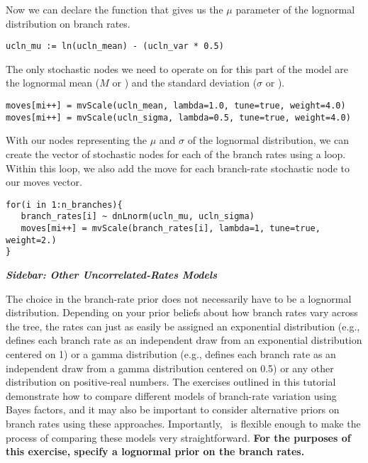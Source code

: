 Now we can declare the function that gives us the $\mu$ parameter of the lognormal distribution on branch rates.
{\tt \begin{snugshade*}
\begin{lstlisting}
ucln_mu := ln(ucln_mean) - (ucln_var * 0.5)
\end{lstlisting}
\end{snugshade*}}

The only stochastic nodes we need to operate on for this part of the model are the lognormal mean ($M$ or ) and the standard deviation ($\sigma$ or ).
{\tt \begin{snugshade*}
\begin{lstlisting}
moves[mi++] = mvScale(ucln_mean, lambda=1.0, tune=true, weight=4.0)
moves[mi++] = mvScale(ucln_sigma, lambda=0.5, tune=true, weight=4.0)
\end{lstlisting}
\end{snugshade*}}

With our nodes representing the $\mu$ and $\sigma$ of the lognormal distribution, we can create the vector of stochastic nodes for each of the branch rates using a  loop. 
Within this loop, we also add the move for each branch-rate stochastic node to our moves vector.
{\tt \begin{snugshade*}
\begin{lstlisting}
for(i in 1:n_branches){
   branch_rates[i] ~ dnLnorm(ucln_mu, ucln_sigma)
   moves[mi++] = mvScale(branch_rates[i], lambda=1, tune=true, weight=2.)
}
\end{lstlisting}
\end{snugshade*}}

\begin{framed}
\textbf{\textit{Sidebar: Other Uncorrelated-Rates Models}}

The choice in the branch-rate prior does not necessarily have to be a lognormal distribution. 
Depending on your prior beliefs about how branch rates vary across the tree, the rates can just as easily be assigned an exponential distribution (e.g., \colorbox{shadecolor}{} defines each branch rate as an independent draw from an exponential distribution centered on 1) or a gamma distribution (e.g., \colorbox{shadecolor}{} defines each branch rate as an independent draw from a gamma distribution centered on 0.5) or any other distribution on positive-real numbers. 
The exercises outlined in this tutorial demonstrate how to compare different models of branch-rate variation using Bayes factors, and it may also be important to consider alternative priors on branch rates using these approaches.
Importantly, \RevBayes~is flexible enough to make the process of comparing these models very straightforward.
\textbf{For the purposes of this exercise, specify a lognormal prior on the branch rates.}
\end{framed}

